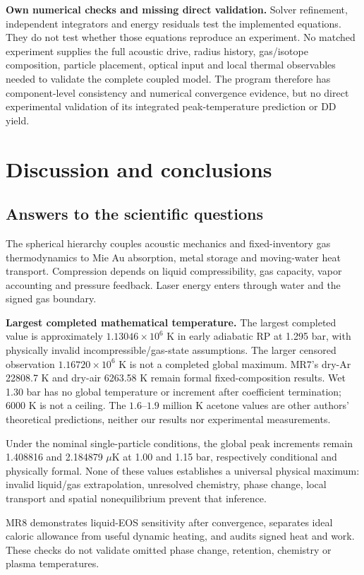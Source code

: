 \documentclass[11pt,a4paper]{article}
\begin{document}
\textbf{Own numerical checks and missing direct validation.} Solver refinement, independent integrators and energy residuals test the implemented equations. They do not test whether those equations reproduce an experiment. No matched experiment supplies the full acoustic drive, radius history, gas/isotope composition, particle placement, optical input and local thermal observables needed to validate the complete coupled model. The program therefore has component-level consistency and numerical convergence evidence, but no direct experimental validation of its integrated peak-temperature prediction or DD yield.
\clearpage
\section{Discussion and conclusions}\label{sec:conclusions}
\subsection{Answers to the scientific questions}
The spherical hierarchy couples acoustic mechanics and fixed-inventory gas thermodynamics to Mie Au absorption, metal storage and moving-water heat transport. Compression depends on liquid compressibility, gas capacity, vapor accounting and pressure feedback. Laser energy enters through water and the signed gas boundary.

\textbf{Largest completed mathematical temperature.} The largest completed value is approximately $1.13046\times10^6$ K in early adiabatic RP at 1.295 bar, with physically invalid incompressible/gas-state assumptions. The larger censored observation $1.16720\times10^6$ K is not a completed global maximum. MR7's dry-Ar 22808.7 K and dry-air 6263.58 K remain formal fixed-composition results. Wet 1.30 bar has no global temperature or increment after coefficient termination; 6000 K is not a ceiling. The $1.6$--$1.9$ million K acetone values are other authors' theoretical predictions, neither our results nor experimental measurements.

Under the nominal single-particle conditions, the global peak increments remain 1.408816 and 2.184879 $\mu$K at 1.00 and 1.15 bar, respectively conditional and physically formal. None of these values establishes a universal physical maximum: invalid liquid/gas extrapolation, unresolved chemistry, phase change, local transport and spatial nonequilibrium prevent that inference.

MR8 demonstrates liquid-EOS sensitivity after convergence, separates ideal caloric allowance from useful dynamic heating, and audits signed heat and work. These checks do not validate omitted phase change, retention, chemistry or plasma temperatures.
\end{document}
